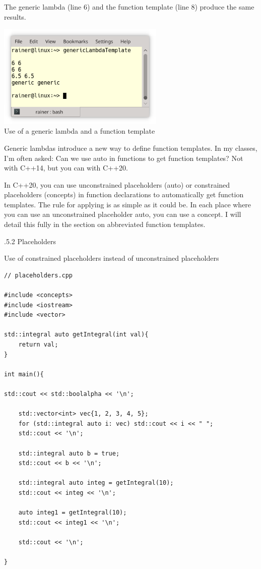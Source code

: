 The generic lambda (line 6) and the function template (line 8) produce the same results.

\begin{center}
\includegraphics[width=0.6\textwidth]{content/3/chapter4/images/8.png}\\
Use of a generic lambda and a function template
\end{center}

Generic lambdas introduce a new way to define function templates. In my classes, I’m often asked: Can we use auto in functions to get function templates? Not with C++14, but you can with C++20.

In C++20, you can use unconstrained placeholders (auto) or constrained placeholders (concepts) in function declarations to automatically get function templates. The rule for applying is as simple as it could be. In each place where you can use an unconstrained placeholder auto, you can use a concept. I will detail this fully in the section on abbreviated function templates.

.5.2\hspace{0.2cm} Placeholders

\noindent
Use of constrained placeholders instead of unconstrained placeholders
\begin{lstlisting}[style=styleCXX]
// placeholders.cpp

#include <concepts>
#include <iostream>
#include <vector>

std::integral auto getIntegral(int val){
	return val;
}

int main(){

std::cout << std::boolalpha << '\n';
	
	std::vector<int> vec{1, 2, 3, 4, 5};
	for (std::integral auto i: vec) std::cout << i << " ";
	std::cout << '\n';
	
	std::integral auto b = true;
	std::cout << b << '\n';
	
	std::integral auto integ = getIntegral(10);
	std::cout << integ << '\n';
	
	auto integ1 = getIntegral(10);
	std::cout << integ1 << '\n';
	
	std::cout << '\n';

}
\end{lstlisting}

